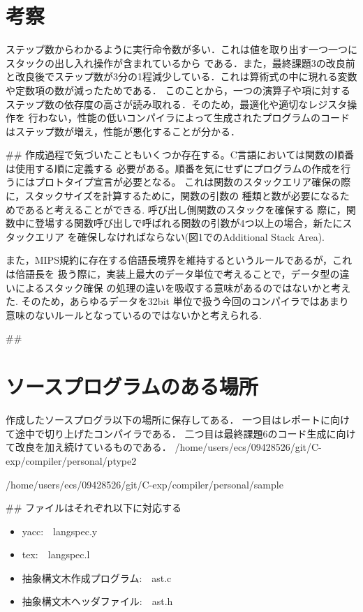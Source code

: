 \documentclass[a4paper,11pt]{jarticle}
\begin{document}
{\begin{verbatim}
\end{verbatim}
\section{考察}
ステップ数からわかるように実行命令数が多い．これは値を取り出す一つ一つにスタックの出し入れ操作が含まれているから
である．また，最終課題3の改良前と改良後でステップ数が3分の1程減少している．これは算術式の中に現れる変数や定数項の数が減ったためである．
このことから，一つの演算子や項に対するステップ数の依存度の高さが読み取れる．そのため，最適化や適切なレジスタ操作を
行わない，性能の低いコンパイラによって生成されたプログラムのコードはステップ数が増え，性能が悪化することが分かる．

##
作成過程で気づいたこともいくつか存在する。C言語においては関数の順番は使用する順に定義する
必要がある。順番を気にせずにプログラムの作成を行うにはプロトタイプ宣言が必要となる。
これは関数のスタックエリア確保の際に，スタックサイズを計算するために，関数の引数の
種類と数が必要になるためであると考えることができる. 呼び出し側関数のスタックを確保する
際に，関数中に登場する関数呼び出しで呼ばれる関数の引数が4つ以上の場合，新たにスタックエリア
を確保しなければならない(図1でのAdditional Stack Area). 

また，MIPS規約に存在する倍語長境界を維持するというルールであるが，これは倍語長を
扱う際に，実装上最大のデータ単位で考えることで，データ型の違いによるスタック確保
の処理の違いを吸収する意味があるのではないかと考えた. そのため，あらゆるデータを32bit
単位で扱う今回のコンパイラではあまり意味のないルールとなっているのではないかと考えられる.

##
\section{ソースプログラムのある場所}

作成したソースプログラ以下の場所に保存してある．
一つ目はレポートに向けて途中で切り上げたコンパイラである．
二つ目は最終課題6のコード生成に向けて改良を加え続けているものである．
/home/users/ecs/09428526/git/C-exp/compiler/personal/ptype2

/home/users/ecs/09428526/git/C-exp/compiler/personal/sample

##
ファイルはそれぞれ以下に対応する
\begin{itemize}
\item yacc:　langspec.y
\item tex:　langspec.l
\item 抽象構文木作成プログラム:　ast.c
\item 抽象構文木ヘッダファイル:　ast.h
\end{itemize}
}
\end{document}
